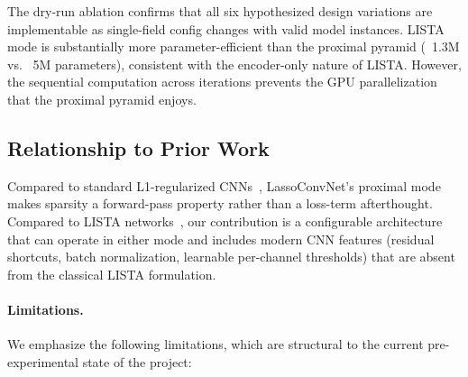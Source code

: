 \documentclass{article}
\begin{document}
The dry-run ablation confirms that all six hypothesized design variations
are implementable as single-field config changes with valid model instances.
LISTA mode is substantially more parameter-efficient than the proximal pyramid
(~1.3M vs. ~5M parameters), consistent with the encoder-only nature of LISTA.
However, the sequential computation across iterations prevents the GPU
parallelization that the proximal pyramid enjoys.

\subsection{Relationship to Prior Work}

Compared to standard L1-regularized CNNs~\cite{han2015learning},
LassoConvNet's proximal mode makes sparsity a forward-pass property rather
than a loss-term afterthought. Compared to LISTA
networks~\cite{gregor2010learning, zhang2018ista}, our contribution is a
configurable architecture that can operate in either mode and includes modern
CNN features (residual shortcuts, batch normalization, learnable per-channel
thresholds) that are absent from the classical LISTA formulation.

\paragraph{Limitations.}
We emphasize the following limitations, which are structural to the current
pre-experimental state of the project:
\end{document}

